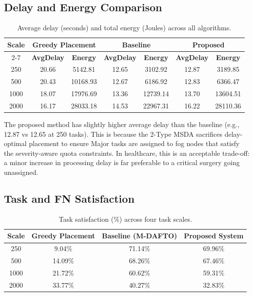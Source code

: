 \subsection{Delay and Energy Comparison}

\begin{table}[htbp]
\centering
\begin{tabular}{|c|c|c|c|c|c|c|}
\hline
\textbf{Scale} & \multicolumn{2}{c|}{\textbf{Greedy Placement}} & \multicolumn{2}{c|}{\textbf{Baseline}} & \multicolumn{2}{c|}{\textbf{Proposed}} \\
\cline{2-7}
 & \textbf{AvgDelay} & \textbf{Energy} & \textbf{AvgDelay} & \textbf{Energy} & \textbf{AvgDelay} & \textbf{Energy} \\
\hline
250  & 20.66 & 5142.81 & 12.65 & 3102.92 & 12.87 & 3189.85 \\
500  & 20.43 & 10168.93 & 12.67 & 6186.92 & 12.83 & 6366.47 \\
1000 & 18.07 & 17976.69 & 13.36 & 12739.14 & 13.70 & 13604.51 \\
2000 & 16.17 & 28033.18 & 14.53 & 22967.31 & 16.22 & 28110.36 \\
\hline
\end{tabular}
\caption{Average delay (seconds) and total energy (Joules) across all algorithms.}
\label{tab:delay_energy}
\end{table}

The proposed method has slightly higher average delay than the baseline (e.g., 12.87 vs 12.65 at 250 tasks). This is because the 2-Type MSDA sacrifices delay-optimal placement to ensure Major tasks are assigned to fog nodes that satisfy the severity-aware quota constraints. In healthcare, this is an acceptable trade-off: a minor increase in processing delay is far preferable to a critical surgery going unassigned.

\subsection{Task and FN Satisfaction}

\begin{table}[htbp]
\centering
\begin{tabular}{|c|c|c|c|}
\hline
\textbf{Scale} & \textbf{Greedy Placement} & \textbf{Baseline (M-DAFTO)} & \textbf{Proposed System} \\
\hline
250  & 9.04\% & 71.14\% & 69.96\% \\
500  & 14.09\% & 68.26\% & 67.46\% \\
1000 & 21.72\% & 60.62\% & 59.31\% \\
2000 & 33.77\% & 40.27\% & 32.83\% \\
\hline
\end{tabular}
\caption{Task satisfaction (\%) across four task scales.}
\label{tab:task_satisfaction}
\end{table}

